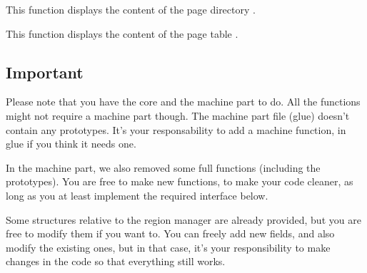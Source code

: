 {
  This function displays the content of the page directory .
}

{
  This function displays the content of the page table .
}

\subsection*{Important}
Please note that you have the core and the machine part to do.
All the functions might not require a machine part though. The machine
part file (glue) doesn't contain any prototypes.
It's your responsability to add a machine function, in glue if you think
it needs one.

\-

In the machine part, we also removed some full functions (including the prototypes). You are free to make new functions, to make your code cleaner, as long as you at least implement the required interface below.

\-

Some structures relative to the region manager are already provided, but you
are free to modify them if you want to. You can freely add new fields, and also
modify the existing ones, but in that case, it's your responsibility to make
changes in the code so that everything still works.
